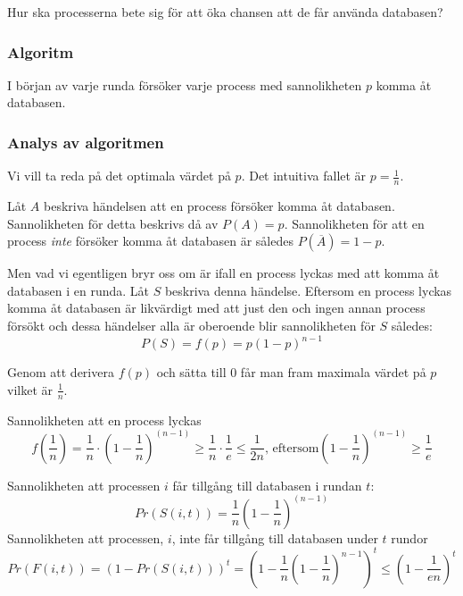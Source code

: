 \documentclass[a4paper]{report}
\begin{document}
Hur ska processerna bete sig för att öka chansen att de får använda databasen?

\subsubsection{Algoritm}
I början av varje runda försöker varje process med sannolikheten $p$ komma åt
databasen.

\subsubsection{Analys av algoritmen}
Vi vill ta reda på det optimala värdet på $p$. Det intuitiva fallet är $p =
\frac{1}{n}$.

Låt $A$ beskriva händelsen att en process försöker komma åt databasen. Sannolikheten för detta beskrivs då av $P(A) = p$. Sannolikheten för att en process \emph{inte} försöker komma åt databasen är således $P(\overline{A}) = 1 - p$. 

Men vad vi egentligen bryr oss om är ifall en process lyckas med att komma åt databasen i en runda. Låt $S$ beskriva denna händelse. Eftersom en process lyckas komma åt databasen är likvärdigt med att just den och ingen annan process försökt och dessa händelser alla är oberoende blir sannolikheten för $S$ således:
\begin{equation}
	P(S) = f(p) = p(1-p)^{n-1}
\end{equation}

Genom att derivera $f(p)$ och sätta till $0$ får man fram maximala värdet på
$p$ vilket är $\frac{1}{n}$.



Sannolikheten att en process lyckas
\begin{equation}
	f(\frac{1}{n}) = \frac{1}{n} \cdot (1 - \frac{1}{n})^{(n-1)} \geq
	\frac{1}{n} \cdot \frac{1}{e} \leq \frac{1}{2n}\mbox{, eftersom} (1 -
	\frac{1}{n})^{(n-1)} \geq \frac{1}{e}
\end{equation}

Sannolikheten att processen $i$ får tillgång till databasen i rundan $t$:
\begin{equation}
	Pr(S(i,t)) = \frac{1}{n}(1 - \frac{1}{n})^{(n-1)}
\end{equation}
Sannolikheten att processen, $i$, inte får tillgång till databasen under $t$
rundor
\begin{equation}
	Pr(F(i,t)) = (1 - Pr(S(i,t)))^t = (1 - \frac{1}{n}(1 -
	\frac{1}{n})^{n-1})^t \leq (1 - \frac{1}{en})^t
\end{equation}
\end{document}
